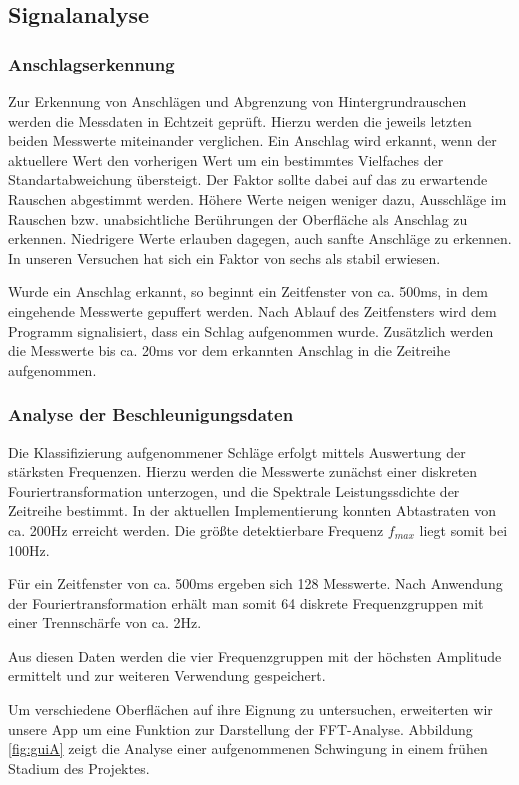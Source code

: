 \subsection{Signalanalyse}
\label{sec:Signalanalyse}
\subsubsection{Anschlagserkennung}
Zur Erkennung von Anschlägen und Abgrenzung von Hintergrundrauschen werden die Messdaten in Echtzeit geprüft. 
Hierzu werden die jeweils letzten beiden Messwerte miteinander verglichen. 
Ein Anschlag wird erkannt, wenn der aktuellere Wert den vorherigen Wert um ein bestimmtes Vielfaches der Standartabweichung übersteigt. 
Der Faktor sollte dabei auf das zu erwartende Rauschen abgestimmt werden.
Höhere Werte neigen weniger dazu, Ausschläge im Rauschen bzw. unabsichtliche Berührungen der Oberfläche als Anschlag zu erkennen.
Niedrigere Werte erlauben dagegen, auch sanfte Anschläge zu erkennen.
In unseren Versuchen hat sich ein Faktor von sechs als stabil erwiesen.

Wurde ein Anschlag erkannt, so beginnt ein Zeitfenster von ca. 500ms, in dem eingehende Messwerte gepuffert werden. 
Nach Ablauf des Zeitfensters wird dem Programm signalisiert, dass ein Schlag aufgenommen wurde. 
Zusätzlich werden die Messwerte bis ca. 20ms vor dem erkannten Anschlag in die Zeitreihe aufgenommen.

\subsubsection{Analyse der Beschleunigungsdaten}
\label{sec:Analyse-a}
Die Klassifizierung aufgenommener Schläge erfolgt mittels Auswertung der stärksten Frequenzen. 
Hierzu werden die Messwerte zunächst einer diskreten Fouriertransformation unterzogen, und die Spektrale Leistungssdichte der Zeitreihe bestimmt.
In der aktuellen Implementierung konnten Abtastraten von ca. 200Hz erreicht werden. 
Die größte detektierbare Frequenz $f_{max}$ liegt somit bei 100Hz.

Für ein Zeitfenster von ca. 500ms ergeben sich 128 Messwerte.
Nach Anwendung der Fouriertransformation erhält man somit 64 diskrete Frequenzgruppen mit einer Trennschärfe von ca. 2Hz.

Aus diesen Daten werden die vier Frequenzgruppen mit der höchsten Amplitude ermittelt und zur weiteren Verwendung gespeichert.

Um verschiedene Oberflächen auf ihre Eignung zu untersuchen, erweiterten wir unsere App um eine Funktion zur Darstellung der FFT-Analyse. Abbildung \ref{fig:guiA} zeigt die Analyse einer aufgenommenen Schwingung in einem frühen Stadium des Projektes.

